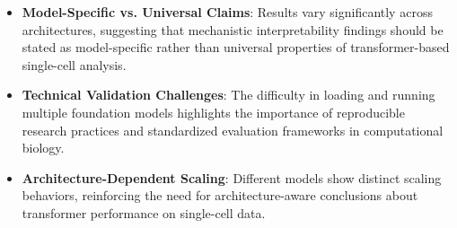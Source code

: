 \begin{itemize}
\item \textbf{Model-Specific vs. Universal Claims}: Results vary significantly across architectures, suggesting that mechanistic interpretability findings should be stated as model-specific rather than universal properties of transformer-based single-cell analysis.

\item \textbf{Technical Validation Challenges}: The difficulty in loading and running multiple foundation models highlights the importance of reproducible research practices and standardized evaluation frameworks in computational biology.

\item \textbf{Architecture-Dependent Scaling}: Different models show distinct scaling behaviors, reinforcing the need for architecture-aware conclusions about transformer performance on single-cell data.
\end{itemize}

